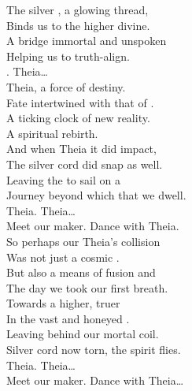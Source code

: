 
\label{album:the-silver-cord}




The silver , a glowing thread, \\
Binds us to the higher divine. \\
A bridge immortal and unspoken \\
Helping us to truth-align. \\

. Theia… \\

Theia, a force of destiny. \\
Fate intertwined with that of . \\
A ticking clock of new reality. \\
A spiritual rebirth. \\
And when Theia it did impact, \\
The silver cord did snap as well. \\
Leaving the  to sail on a \\
Journey beyond which that we dwell. \\

Theia. Theia… \\

Meet our maker. Dance with Theia. \\

So perhaps our Theia's collision \\
Was not just a cosmic . \\
But also a means of fusion and \\
The day we took our first breath. \\
Towards a higher, truer  \\
In the vast and honeyed . \\
Leaving behind our mortal coil. \\
Silver cord now torn, the spirit flies. \\

Theia. Theia… \\

Meet our maker. Dance with Theia… \\

